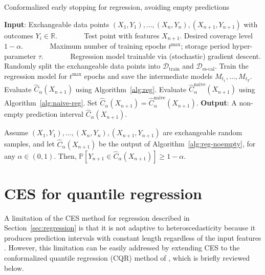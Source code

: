 \begin{algorithm}[H]
    \caption{Conformalized early stopping for regression, avoiding empty predictions}
    \label{alg:reg-noempty}
    \begin{algorithmic}[1]
        \STATE \textbf{Input}: Exchangeable data points $(X_{1},Y_{1}), \ldots, (X_{n},Y_{n}), (X_{n+1},Y_{n+1})$ with outcomes $Y_i \in \mathbb{R}$.
        \STATE \textcolor{white}{\textbf{Input}:} Test point with features $X_{n+1}$. Desired coverage level $1-\alpha$.
        \STATE \textcolor{white}{\textbf{Input}:} Maximum number of training epochs $t^{\max}$; storage period hyper-parameter $\tau$.
        \STATE \textcolor{white}{\textbf{Input}:} Regression model trainable via (stochastic) gradient descent.
        \STATE Randomly split the exchangeable data points into $\mathcal{D}_{\text{train}}$ and $\mathcal{D}_{\text{es-cal}}$.
        \STATE Train the regression model for $t^{\text{max}}$ epochs and save the intermediate models $M_{t_1} , \dots, M_{t_T}$.
        \STATE Evaluate $\hat{C}_{\alpha}(X_{n+1})$ using Algorithm~\ref{alg:reg}.
        \STATE Evaluate $\hat{C}^{\text{naive}}_{\alpha}(X_{n+1})$ using Algorithm~\ref{alg:naive-reg}. Set $\hat{C}_{\alpha}(X_{n+1}) = \hat{C}^{\text{naive}}_{\alpha}(X_{n+1})$.
        \ENDIF
        \STATE \textbf{Output}: A non-empty prediction interval $\hat{C}_{\alpha}(X_{n+1})$.
    \end{algorithmic}
\end{algorithm}

\begin{corollary}\label{thm:reg-noempty}
Assume $(X_{1},Y_{1}), \ldots, (X_{n},Y_{n}), (X_{n+1},Y_{n+1})$ are exchangeable random samples, and let $\hat{C}_{\alpha}(X_{n+1})$ be the output of Algorithm~\ref{alg:reg-noempty}, for any $\alpha \in (0,1)$. 
Then, $\mathbb{P}[Y_{n+1} \in \hat{C}_{\alpha}(X_{n+1})] \geq 1-\alpha$.
\end{corollary}


\section{CES for quantile regression} \label{sec:quantile-regression}

A limitation of the CES method for regression described in Section~\ref{sec:regression} is that it is not adaptive to heteroscedasticity because it produces prediction intervals with constant length regardless of the input features \cite{romano2019conformalized}.
However, this limitation can be easily addressed by extending CES to the conformalized quantile regression (CQR) method of \citet{romano2019conformalized}, which is briefly reviewed below.

